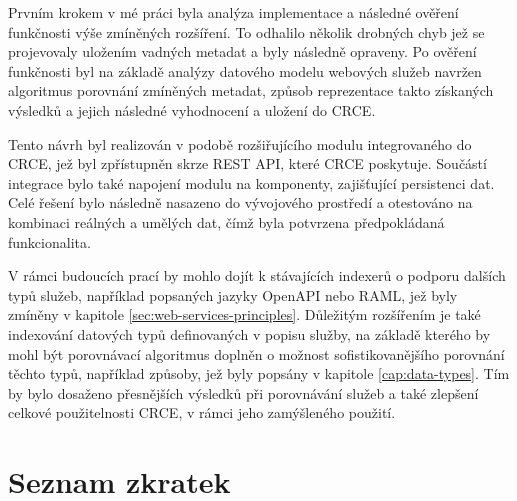 \documentclass[czech,DP]{thesiskiv}
\begin{document}
Prvním krokem v mé práci byla analýza implementace a následné ověření funkčnosti výše zmíněných rozšíření. To odhalilo několik drobných chyb jež se projevovaly uložením vadných metadat a byly následně opraveny. Po ověření funkčnosti byl na základě analýzy datového modelu webových služeb navržen algoritmus porovnání zmíněných metadat, způsob reprezentace takto získaných výsledků a jejich následné vyhodnocení a uložení do CRCE. 

Tento návrh byl realizován v podobě rozšiřujícího modulu integrovaného do CRCE, jež byl zpřístupněn skrze REST API, které CRCE poskytuje. Součástí integrace bylo také napojení modulu na komponenty, zajišťující persistenci dat. Celé řešení bylo následně nasazeno do vývojového prostředí a otestováno na kombinaci reálných a umělých dat, čímž byla potvrzena předpokládaná funkcionalita.

V rámci budoucích prací by mohlo dojít k stávajících indexerů o podporu dalších typů služeb, například popsaných jazyky OpenAPI nebo RAML, jež byly zmíněny v kapitole \ref{sec:web-services-principles}. Důležitým rozšířením je také indexování datových typů definovaných v popisu služby, na základě kterého by mohl být porovnávací algoritmus doplněn o možnost sofistikovanějšího porovnání těchto typů, například způsoby, jež byly popsány v kapitole \ref{cap:data-types}. Tím by bylo dosaženo přesnějších výsledků při porovnávání služeb a také zlepšení celkové použitelnosti CRCE, v rámci jeho zamýšleného použití.



 
% 
%

{\raggedright\small

}

\chapter*{Seznam zkratek}
\end{document}
